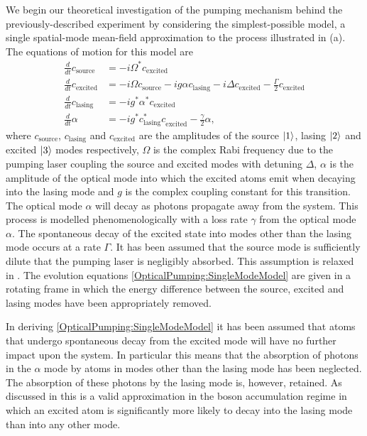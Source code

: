 We begin our theoretical investigation of the pumping mechanism behind the previously-described experiment by considering the simplest-possible model, a single spatial-mode mean-field approximation to the process illustrated in (a).  The equations of motion for this model are
\begin{subequations}
    \label{OpticalPumping:SingleModeModel}
    \begin{align}
        \frac{d}{dt} c_\text{source} &= -i \Omega^* c_\text{excited} \\
        \frac{d }{dt}c_\text{excited} &= -i \Omega c_\text{source} -i g \alpha c_\text{lasing} - i \Delta c_\text{excited} - \frac{\Gamma}{2} c_\text{excited}\\
        \frac{d }{dt}c_\text{lasing} &= -i g^* \alpha^* c_\text{excited} \\
        \frac{d }{dt}\alpha &= -i g^* c_\text{lasing}^* c_\text{excited}^{\phantom{*}} - \frac{\gamma}{2} \alpha,
    \end{align} 
\end{subequations}
where $c_\text{source}$, $c_\text{lasing}$ and $c_\text{excited}$ are the amplitudes of the source ${\left|1\right>}$, lasing ${\left|2\right>}$ and excited ${\left|3\right>}$ modes respectively, $\Omega$ is the complex Rabi frequency due to the pumping laser coupling the source and excited modes with detuning $\Delta$, $\alpha$ is the amplitude of the optical mode into which the excited atoms emit when decaying into the lasing mode and $g$ is the complex coupling constant for this transition.  The optical mode $\alpha$ will decay as photons propagate away from the system.  This process is modelled phenomenologically with a loss rate $\gamma$ from the optical mode $\alpha$.  The spontaneous decay of the excited state into modes other than the lasing mode occurs at a rate $\Gamma$.  It has been assumed that the source mode is sufficiently dilute that the pumping laser is negligibly absorbed.  This assumption is relaxed in .  The evolution equations \eqref{OpticalPumping:SingleModeModel} are given in a rotating frame in which the energy difference between the source, excited and lasing modes have been appropriately removed.

In deriving \eqref{OpticalPumping:SingleModeModel} it has been assumed that atoms that undergo spontaneous decay from the excited mode will have no further impact upon the system.  In particular this means that the absorption of photons in the $\alpha$ mode by atoms in modes other than the lasing mode has been neglected.  The absorption of these photons by the lasing mode is, however, retained.  As discussed in  this is a valid approximation in the boson accumulation regime in which an excited atom is significantly more likely to decay into the lasing mode than into any other mode.

